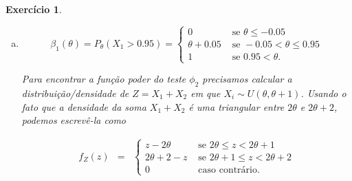 \documentclass[letter,11pt]{article}
\newtheorem{exer}{Exercício}
\begin{document}
\begin{exer}
\begin{enumerate}[a)]
Podemos usar a convolução para obter a densidade de $Z$. Assim, para $0\leq z\leq 2$

\begin{eqnarray*}
f_Z(z)&=&f_{X_1+X_2}(z)=
\int_{-\infty}^{\infty}f_x(x)f_Y(z-x)dx\\
&=&\int_{0}^{1}f_x(x)f_Y(z-x)dx
=\int_{0}^{1}f_Y(z-x)dx\\
&=&\begin{cases}
 \int_{0}^{z} f_Y(z-x)dx & \mbox{ se } 0\leq z< 1\\
 \int_{z-1}^{1} f_Y(z-x)dx & \mbox{ se } 1\leq z\leq 2\\
\end{cases}\\
&=&\begin{cases}
 z & \mbox{ se } 0\leq z< 1\\
 2-z & \mbox{ se } 1\leq z< 2\\
 0 & \mbox{ caso contrário.}
\end{cases}
\end{eqnarray*} 

Assim, para encontrar $C$ tal que $P(X_1+X_2 > C)=0.05$ é razoável/necessário assumir que $1\leq C\leq 2$. Logo

\[P(X_1+X_2>C]=P(Z>C)=\int_{C}^{1}(2-z)dz=\frac{(2-C)^2}{2}.\]


Segue que $\alpha=0.05$,  C= 1.68.%

\item    %

\[\beta_1(\theta)=P_\theta(X_1>0.95)=\begin{cases}
 0 & \mbox{ se } \theta\leq -0.05\\
 \theta+0.05 & \mbox{ se } -0.05< \theta\leq 0.95\\
 1 & \mbox{ se } 0.95<\theta.
\end{cases}\]

Para encontrar a função poder do teste $\phi_2$ precisamos calcular a distribuição/densidade de $Z=X_1+X_2$ em que $X_i\sim U(\theta,\theta+1)$. Usando o fato que a densidade da soma $X_1+X_2$ é uma triangular entre $2\theta$ e $2\theta+2$, podemos escrevê-la como

\begin{eqnarray*}
f_Z(z)
&=&\begin{cases}
 z-2\theta & \mbox{ se } 2\theta \leq z< 2\theta+1\\
 2\theta +2-z & \mbox{ se } 2\theta+1\leq z <2\theta+ 2\\
 0 & \mbox{ caso contrário.}
\end{cases}
\end{eqnarray*} 



\end{enumerate}
\end{exer}
\end{document}
